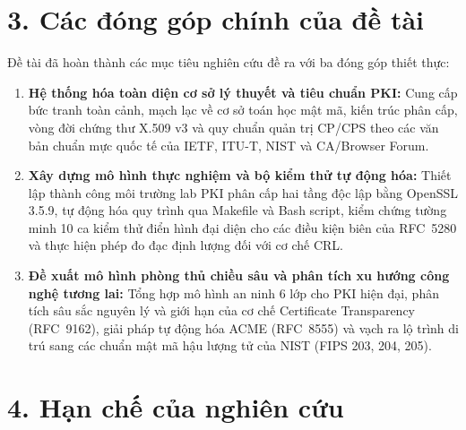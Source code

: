\section*{3. Các đóng góp chính của đề tài}

Đề tài đã hoàn thành các mục tiêu nghiên cứu đề ra với ba đóng góp thiết thực:
\begin{enumerate}
    \item \textbf{Hệ thống hóa toàn diện cơ sở lý thuyết và tiêu chuẩn PKI:} Cung cấp bức tranh toàn cảnh, mạch lạc về cơ sở toán học mật mã, kiến trúc phân cấp, vòng đời chứng thư X.509 v3 và quy chuẩn quản trị CP/CPS theo các văn bản chuẩn mực quốc tế của IETF, ITU-T, NIST và CA/Browser Forum.
    \item \textbf{Xây dựng mô hình thực nghiệm và bộ kiểm thử tự động hóa:} Thiết lập thành công môi trường lab PKI phân cấp hai tầng độc lập bằng OpenSSL 3.5.9, tự động hóa quy trình qua Makefile và Bash script, kiểm chứng tường minh 10 ca kiểm thử điển hình đại diện cho các điều kiện biên của RFC~5280 và thực hiện phép đo đạc định lượng đối với cơ chế CRL.
    \item \textbf{Đề xuất mô hình phòng thủ chiều sâu và phân tích xu hướng công nghệ tương lai:} Tổng hợp mô hình an ninh 6 lớp cho PKI hiện đại, phân tích sâu sắc nguyên lý và giới hạn của cơ chế Certificate Transparency (RFC~9162), giải pháp tự động hóa ACME (RFC~8555) và vạch ra lộ trình di trú sang các chuẩn mật mã hậu lượng tử của NIST (FIPS 203, 204, 205).
\end{enumerate}

\section*{4. Hạn chế của nghiên cứu}

